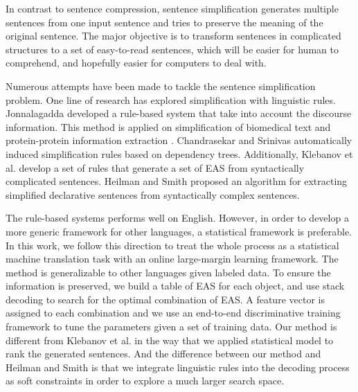 \documentclass[10pt]{article}
\begin{document}
 

In contrast to sentence compression, sentence simplification generates multiple sentences from one input sentence and tries to preserve the meaning of the original sentence. 
The major objective is to transform sentences in complicated structures to a set of easy-to-read sentences, which will be easier for human to comprehend, and hopefully easier for computers to deal with. 

Numerous attempts have been made to tackle the sentence simplification problem.
One line of research has explored simplification with linguistic rules. 
Jonnalagadda  developed a rule-based system that take into account the discourse information. 
This method is applied on simplification of biomedical text \cite{Siddhartha:09} and protein-protein information extraction \cite{Siddhartha:10}.
Chandrasekar and Srinivas  automatically induced simplification rules based on dependency trees.
Additionally, Klebanov et al.  develop a set of rules that generate a set of EAS from syntactically complicated sentences. 
Heilman and Smith  proposed an algorithm for extracting simplified declarative sentences from syntactically complex sentences. 

The rule-based systems performs well on English. However, in order to develop a more generic framework for other languages, a statistical framework is preferable.
In this work, we follow this direction to treat the whole process as a statistical machine translation task with an online large-margin learning framework. The method is generalizable to other languages given labeled data.
To ensure the information is preserved, we build a table of EAS for each object, and use stack decoding to search for the optimal combination of EAS. 
A feature vector is assigned to each combination and we use an end-to-end discriminative training framework to tune the parameters given a set of training data. 
Our method is different from Klebanov et al.  in the way that we applied statistical model to rank the generated sentences. 
And the difference between our method and Heilman and Smith  is that we integrate linguistic rules into the decoding process as soft constraints in order to explore a much larger search space.
\end{document}
